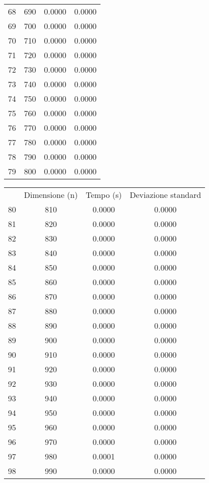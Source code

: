 \begin{table}
\begin{adjustbox}{width=1\textwidth/2}
\begin{tabular}{|c|c|c|c|}
68 & 690 & 0.0000 & 0.0000 \\
\cline{1-4}
69 & 700 & 0.0000 & 0.0000 \\
\cline{1-4}
70 & 710 & 0.0000 & 0.0000 \\
\cline{1-4}
71 & 720 & 0.0000 & 0.0000 \\
\cline{1-4}
72 & 730 & 0.0000 & 0.0000 \\
\cline{1-4}
73 & 740 & 0.0000 & 0.0000 \\
\cline{1-4}
74 & 750 & 0.0000 & 0.0000 \\
\cline{1-4}
75 & 760 & 0.0000 & 0.0000 \\
\cline{1-4}
76 & 770 & 0.0000 & 0.0000 \\
\cline{1-4}
77 & 780 & 0.0000 & 0.0000 \\
\cline{1-4}
78 & 790 & 0.0000 & 0.0000 \\
\cline{1-4}
79 & 800 & 0.0000 & 0.0000 \\
\cline{1-4}
\end{tabular}
\end{adjustbox}
\end{table}

\begin{table}
\centering
\begin{adjustbox}{width=1\textwidth/2}
\begin{tabular}{|c|c|c|c|}
\hline
 & Dimensione (n) & Tempo (s) & Deviazione standard \\
80 & 810 & 0.0000 & 0.0000 \\
\cline{1-4}
81 & 820 & 0.0000 & 0.0000 \\
\cline{1-4}
82 & 830 & 0.0000 & 0.0000 \\
\cline{1-4}
83 & 840 & 0.0000 & 0.0000 \\
\cline{1-4}
84 & 850 & 0.0000 & 0.0000 \\
\cline{1-4}
85 & 860 & 0.0000 & 0.0000 \\
\cline{1-4}
86 & 870 & 0.0000 & 0.0000 \\
\cline{1-4}
87 & 880 & 0.0000 & 0.0000 \\
\cline{1-4}
88 & 890 & 0.0000 & 0.0000 \\
\cline{1-4}
89 & 900 & 0.0000 & 0.0000 \\
\cline{1-4}
90 & 910 & 0.0000 & 0.0000 \\
\cline{1-4}
91 & 920 & 0.0000 & 0.0000 \\
\cline{1-4}
92 & 930 & 0.0000 & 0.0000 \\
\cline{1-4}
93 & 940 & 0.0000 & 0.0000 \\
\cline{1-4}
94 & 950 & 0.0000 & 0.0000 \\
\cline{1-4}
95 & 960 & 0.0000 & 0.0000 \\
\cline{1-4}
96 & 970 & 0.0000 & 0.0000 \\
\cline{1-4}
97 & 980 & 0.0001 & 0.0000 \\
\cline{1-4}
98 & 990 & 0.0000 & 0.0000 \\
\cline{1-4}
\end{tabular}
\end{adjustbox}
\end{table}

